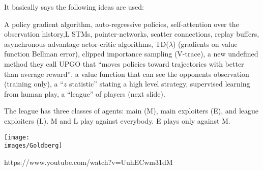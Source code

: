 {

It basically says the following ideas are used:

A policy gradient algorithm, auto-regressive policies, self-attention over the observation history,L STMs, pointer-networks, scatter connections,
replay buffers, asynchronous advantage actor-critic algorithms, TD($\lambda$) (gradients on value function Bellman error), clipped importance sampling
(V-trace), a new undefined method they call UPGO that ``moves policies toward trajectories with better than average reward'', a value function
that can see the opponents observation (training only), a ``$z$ statistic'' stating a high level strategy, 
supervised learning from human play, 
a ``league'' of players (next slide).


The league has three classes of agents: main (M), main exploiters (E), and league exploiters (L).  M and L play against everybody.
E plays only against M.


\centerline{\texttt{[image: \\images/Goldberg]}}


https://www.youtube.com/watch?v=UuhECwm31dM


}

